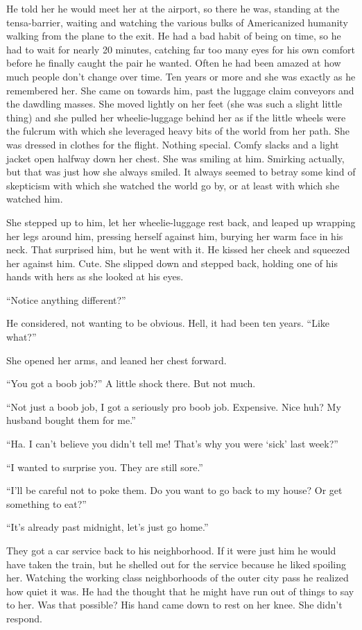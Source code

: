 \documentclass[letterpaper]{article}
\begin{document}
He told her he would meet her at the airport, so there he was, standing at the tensa-barrier, waiting and watching the various bulks of Americanized humanity walking from the plane to the exit.
He had a bad habit of being on time, so he had to wait for nearly 20 minutes, catching far too many eyes for his own comfort before he finally caught the pair he wanted.
Often he had been amazed at how much people don't change over time. Ten years or more and she was exactly as he remembered her.
She came on towards him, past the luggage claim conveyors and the dawdling masses. She moved lightly on her feet (she was such a slight little thing) and she pulled her wheelie-luggage behind her as if the little wheels were the fulcrum with which she leveraged heavy bits of the world from her path.
She was dressed in clothes for the flight. Nothing special. Comfy slacks and a light jacket open halfway down her chest. She was smiling at him. Smirking actually, but that was just how she always smiled. It always seemed to betray some kind of skepticism with which she watched the world go by, or at least with which she watched him.

She stepped up to him, let her wheelie-luggage rest back, and leaped up wrapping her legs around him, pressing herself against him, burying her warm face in his neck.
That surprised him, but he went with it. He kissed her cheek and squeezed her against him. Cute.
She slipped down and stepped back, holding one of his hands with hers as she looked at his eyes.

``Notice anything different?''

He considered, not wanting to be obvious. Hell, it had been ten years. ``Like what?''

She opened her arms, and leaned her chest forward.

``You got a boob job?'' A little shock there. But not much.

``Not just a boob job, I got a seriously pro boob job. Expensive. Nice huh? My husband bought them for me.''

``Ha. I can't believe you didn't tell me! That's why you were `sick' last week?''

``I wanted to surprise you. They are still sore.''

``I'll be careful not to poke them. Do you want to go back to my house? Or get something to eat?''

``It's already past midnight, let's just go home.''

They got a car service back to his neighborhood. If it were just him he would have taken the train, but he shelled out for the service because he liked spoiling her.
Watching the working class neighborhoods of the outer city pass he realized how quiet it was. He had the thought that he might have run out of things to say to her.
Was that possible?
His hand came down to rest on her knee. She didn't respond.
\end{document}
